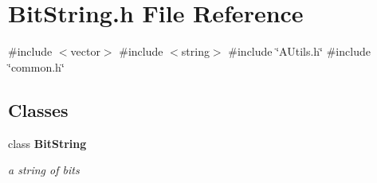 \section{Bit\+String.\+h File Reference}
\label{BitString_8h}
{\ttfamily \#include $<$vector$>$}\newline
{\ttfamily \#include $<$string$>$}\newline
{\ttfamily \#include \char`\"{}A\+Utils.\+h\char`\"{}}\newline
{\ttfamily \#include \char`\"{}common.\+h\char`\"{}}\newline
\subsection*{Classes}
\begin{DoxyCompactItemize}
\item 
class \textbf{ Bit\+String}
\begin{DoxyCompactList}\small\item\em a string of bits \end{DoxyCompactList}\end{DoxyCompactItemize}
